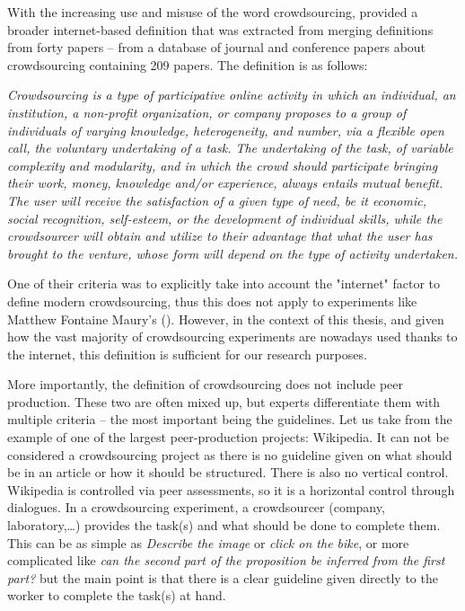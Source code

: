 With the increasing use and misuse of the word crowdsourcing, \citet{estelles2012towards} provided a broader internet-based definition that was extracted from merging definitions from forty papers -- from a database of journal and conference papers about crowdsourcing containing 209 papers. The definition is as follows:
\begin{center}
\begin{minipage}{.75\textwidth}
\emph{
Crowdsourcing is a type of participative online activity in which an individual, an institution, a non-profit
organization, or company proposes to a group of individuals of varying knowledge, heterogeneity, and
number, via a flexible open call, the voluntary undertaking of a task. The undertaking of the task, of variable complexity and modularity, and in which the crowd should participate bringing their work, money, knowledge and/or experience, always entails mutual benefit. The user will receive the satisfaction of a given type of need, be it economic, social recognition, self-esteem, or the development of individual skills, while the crowdsourcer will obtain and utilize to their advantage that what the user has brought to the venture, whose form will depend on the type of activity undertaken.
}
\end{minipage}
\end{center}

One of their criteria was to explicitly take into account the "internet" factor to define modern crowdsourcing, thus this does not apply to experiments like Matthew Fontaine Maury's (). However, in the context of this thesis, and given how the vast majority of crowdsourcing experiments are nowadays used thanks to the internet, this definition is sufficient for our research purposes.

More importantly, the definition of crowdsourcing does not include peer production.
These two are often mixed up, but experts \citep{brabham2013crowdsourcing} differentiate them with multiple criteria -- the most important being the guidelines.
Let us take from \citet{brabham2013crowdsourcing} the example of one of the largest peer-production projects: Wikipedia.
It can not be considered a crowdsourcing project as there is no guideline given on what should be in an article or how it should be structured.
There is also no vertical control.
Wikipedia is controlled via peer assessments, so it is a horizontal control through dialogues.
In a crowdsourcing experiment, a crowdsourcer (company, laboratory,\dots) provides the task(s) and what should be done to complete them.
This can be as simple as \emph{Describe the image} or \emph{click on the bike}, or more complicated like \emph{can the second part of the proposition be inferred from the first part?} but the main point is that there is a clear guideline given directly to the worker to complete the task(s) at hand.


